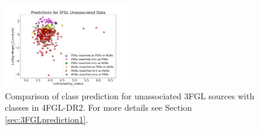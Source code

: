\begin{table}[!h]
\hspace{-0.2cm}
    \vspace{2mm}
    \caption{Testing accuracy of the 4 selected algorithms for classification of 3FGL sources and comparison with associations in the 4FGL-DR2 catalog. 
    ``\_O'' denotes training with oversampling.}
    \label{tab:selected_algs}
\end{table}



\begin{figure}[h]
\centering
\includegraphics[width=0.48\textwidth]{plots/plot_final_DR2.pdf}
\caption{Comparison of class prediction for unassociated 3FGL sources with classes in 4FGL-DR2. 
For more details see Section \ref{sec:3FGLprediction1}.}
\label{fig:3FGL_vs_4FGL_classes}
\end{figure}

